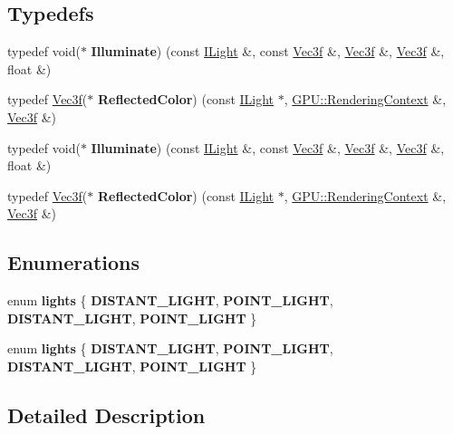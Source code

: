 \subsection*{Typedefs}
\begin{DoxyCompactItemize}
\item 
typedef void($\ast$ {\bfseries Illuminate}) (const \hyperlink{class_i_light}{I\+Light} \&, const \hyperlink{class_vec3}{Vec3f} \&, \hyperlink{class_vec3}{Vec3f} \&, \hyperlink{class_vec3}{Vec3f} \&, float \&)\hypertarget{group__lights_ga8a5d15252b2bfd290218ef2cd88c51ee}{}\label{group__lights_ga8a5d15252b2bfd290218ef2cd88c51ee}

\item 
typedef \hyperlink{class_vec3}{Vec3f}($\ast$ {\bfseries Reflected\+Color}) (const \hyperlink{class_i_light}{I\+Light} $\ast$, \hyperlink{struct_g_p_u_1_1_rendering_context}{G\+P\+U\+::\+Rendering\+Context} \&, \hyperlink{class_vec3}{Vec3f} \&)\hypertarget{group__lights_ga1445cd39b3bf19d4237cd41d2de2243e}{}\label{group__lights_ga1445cd39b3bf19d4237cd41d2de2243e}

\item 
typedef void($\ast$ {\bfseries Illuminate}) (const \hyperlink{class_i_light}{I\+Light} \&, const \hyperlink{class_vec3}{Vec3f} \&, \hyperlink{class_vec3}{Vec3f} \&, \hyperlink{class_vec3}{Vec3f} \&, float \&)\hypertarget{group__lights_ga8a5d15252b2bfd290218ef2cd88c51ee}{}\label{group__lights_ga8a5d15252b2bfd290218ef2cd88c51ee}

\item 
typedef \hyperlink{class_vec3}{Vec3f}($\ast$ {\bfseries Reflected\+Color}) (const \hyperlink{class_i_light}{I\+Light} $\ast$, \hyperlink{struct_g_p_u_1_1_rendering_context}{G\+P\+U\+::\+Rendering\+Context} \&, \hyperlink{class_vec3}{Vec3f} \&)\hypertarget{group__lights_ga1445cd39b3bf19d4237cd41d2de2243e}{}\label{group__lights_ga1445cd39b3bf19d4237cd41d2de2243e}

\end{DoxyCompactItemize}
\subsection*{Enumerations}
\begin{DoxyCompactItemize}
\item 
enum {\bfseries lights} \{ {\bfseries D\+I\+S\+T\+A\+N\+T\+\_\+\+L\+I\+G\+HT}, 
{\bfseries P\+O\+I\+N\+T\+\_\+\+L\+I\+G\+HT}, 
{\bfseries D\+I\+S\+T\+A\+N\+T\+\_\+\+L\+I\+G\+HT}, 
{\bfseries P\+O\+I\+N\+T\+\_\+\+L\+I\+G\+HT}
 \}\hypertarget{group__lights_ga9364632a9ecc72c4ccec5a0db539657d}{}\label{group__lights_ga9364632a9ecc72c4ccec5a0db539657d}

\item 
enum {\bfseries lights} \{ {\bfseries D\+I\+S\+T\+A\+N\+T\+\_\+\+L\+I\+G\+HT}, 
{\bfseries P\+O\+I\+N\+T\+\_\+\+L\+I\+G\+HT}, 
{\bfseries D\+I\+S\+T\+A\+N\+T\+\_\+\+L\+I\+G\+HT}, 
{\bfseries P\+O\+I\+N\+T\+\_\+\+L\+I\+G\+HT}
 \}\hypertarget{group__lights_ga9364632a9ecc72c4ccec5a0db539657d}{}\label{group__lights_ga9364632a9ecc72c4ccec5a0db539657d}

\end{DoxyCompactItemize}


\subsection{Detailed Description}
